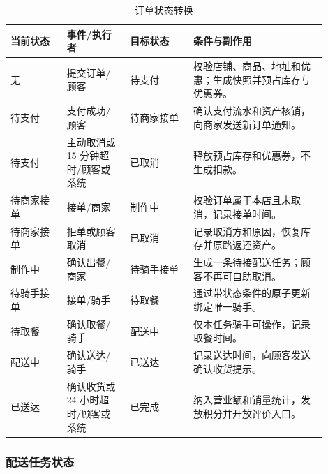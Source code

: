 \begin{longtable}{|L{0.16\linewidth}|L{0.18\linewidth}|L{0.18\linewidth}|L{0.38\linewidth}|}
\caption{订单状态转换}\label{tab:order-state}\\ \hline
\textbf{当前状态} & \textbf{事件/执行者} & \textbf{目标状态} & \textbf{条件与副作用} \\ \hline
无 & 提交订单/顾客 & 待支付 & 校验店铺、商品、地址和优惠；生成快照并预占库存与优惠券。 \\ \hline
待支付 & 支付成功/顾客 & 待商家接单 & 确认支付流水和资产核销，向商家发送新订单通知。 \\ \hline
待支付 & 主动取消或 15 分钟超时/顾客或系统 & 已取消 & 释放预占库存和优惠券，不生成扣款。 \\ \hline
待商家接单 & 接单/商家 & 制作中 & 校验订单属于本店且未取消，记录接单时间。 \\ \hline
待商家接单 & 拒单或顾客取消 & 已取消 & 记录取消方和原因，恢复库存并原路返还资产。 \\ \hline
制作中 & 确认出餐/商家 & 待骑手接单 & 生成一条待接配送任务；顾客不再可自助取消。 \\ \hline
待骑手接单 & 接单/骑手 & 待取餐 & 通过带状态条件的原子更新绑定唯一骑手。 \\ \hline
待取餐 & 确认取餐/骑手 & 配送中 & 仅本任务骑手可操作，记录取餐时间。 \\ \hline
配送中 & 确认送达/骑手 & 已送达 & 记录送达时间，向顾客发送确认收货提示。 \\ \hline
已送达 & 确认收货或 24 小时超时/顾客或系统 & 已完成 & 纳入营业额和销量统计，发放积分并开放评价入口。 \\ \hline
\end{longtable}

\subsubsection{配送任务状态}


